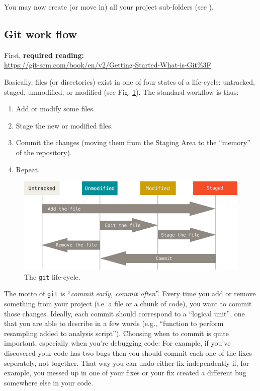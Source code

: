 \documentclass[12pt,letterpaper]{article}
\begin{document}
You may now create (or move in) all your project sub-folders  (see ).


\subsection{Git work flow}
First, \textbf{required reading:}\\
\url{https://git-scm.com/book/en/v2/Getting-Started-What-is-Git%3F}

Basically, files (or directories) exist in one of four states of a life-cycle: untracked, staged, unmodified, or modified (see Fig. \ref{fig:lifecycle}).  The standard workflow is thus:
\begin{enumerate}
	\item Add or modify some files.
	\item Stage the new or modified files.
	\item Commit the changes (moving them from the Staging Area to the ``memory'' of the repository).
	\item Repeat.
\end{enumerate}

\begin{figure}
	\includegraphics[width=\linewidth]{figs/lifecycle.png}
	\caption{The \texttt{git} life-cycle.}
	\label{fig:lifecycle}
\end{figure}

The motto of \texttt{git} is ``\emph{commit early, commit often}''.  Every time you add or remove something from your project (i.e. a file or a chunk of code), you want to commit those changes.   Ideally, each commit should correspond to a ``logical unit'', one that you are able to describe in a few words (e.g., ``function to perform resampling added to analysis script''). Choosing when to commit is quite important, especially when you're debugging code:  For example, if you've discovered your code has two bugs then you should commit each one of the fixes seperately, not together.  That way you can undo either fix independently if, for example, you messed up in one of your fixes or your fix created a different bug somewhere else in your code.
\end{document}
